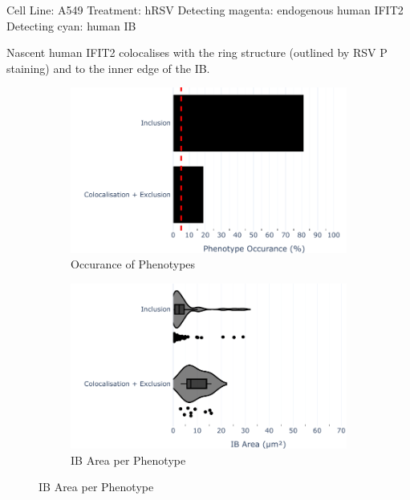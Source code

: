 Cell Line: A549 \newline
Treatment: hRSV \newline
Detecting magenta: endogenous human IFIT2  \newline
Detecting cyan: human IB \newline

Nascent human IFIT2 colocalises with the ring structure (outlined by RSV P staining) and to the inner edge of the IB.

\begin{figure}
    \begin{subfigure}{0.5\textwidth}
        \includegraphics[width=1\linewidth]{10. Chapter 5/Figs/01. Infection/01. IFIT2A/04. bar_i2a_a549-p.pdf} 
        \caption[]{Occurance of Phenotypes}
    \end{subfigure}
    \begin{subfigure}{0.5\textwidth}
        \includegraphics[width=1\linewidth]{10. Chapter 5/Figs/01. Infection/01. IFIT2A/05. violin_i2a_a549-p.pdf}
        \caption[]{IB Area per Phenotype}
    \end{subfigure}


\end{figure}
